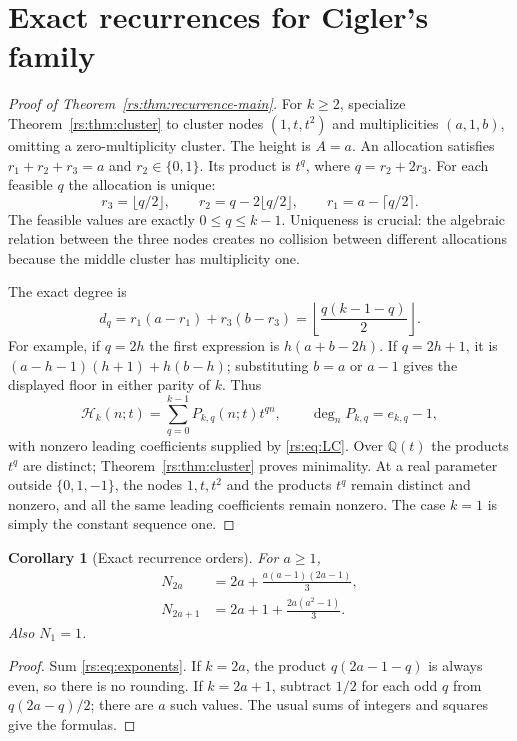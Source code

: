 \documentclass[11pt]{article}
\newtheorem{corollary}[theorem]{Corollary}
\theoremstyle{definition}
\theoremstyle{remark}
\newcommand{\Q}{\mathbb Q}
\newcommand{\Ht}{\mathcal H}
\theoremstyle{definition}
\theoremstyle{plain}
\numberwithin{equation}{section}
\begin{document}
\section{Exact recurrences for Cigler's family}
\label{rs:sec:recurrence}
\begin{proof}[Proof of Theorem~\ref{rs:thm:recurrence-main}]
For $k\ge2$, specialize Theorem~\ref{rs:thm:cluster} to cluster nodes
$(1,t,t^2)$ and multiplicities $(a,1,b)$, omitting a zero-multiplicity cluster.
The height is $A=a$. An allocation satisfies $r_1+r_2+r_3=a$ and
$r_2\in\{0,1\}$. Its product is $t^q$, where $q=r_2+2r_3$.
For each feasible $q$ the allocation is unique:
\begin{equation}
 r_3=\lfloor q/2\rfloor,\qquad r_2=q-2\lfloor q/2\rfloor,
 \qquad r_1=a-\lceil q/2\rceil.
 \label{rs:eq:qallocation}
\end{equation}
The feasible values are exactly $0\le q\le k-1$. Uniqueness is crucial:
the algebraic relation between the three nodes creates no collision between
different allocations because the middle cluster has multiplicity one.

The exact degree is
\begin{equation}
 d_q=r_1(a-r_1)+r_3(b-r_3)
     =\left\lfloor\frac{q(k-1-q)}2\right\rfloor.
 \label{rs:eq:dq}
\end{equation}
For example, if $q=2h$ the first expression is $h(a+b-2h)$.
If $q=2h+1$, it is $(a-h-1)(h+1)+h(b-h)$; substituting $b=a$ or $a-1$
gives the displayed floor in either parity of $k$.
Thus
\begin{equation}
 \Ht_k(n;t)=\sum_{q=0}^{k-1}P_{k,q}(n;t)t^{qn},\qquad
 \deg_n P_{k,q}=e_{k,q}-1,
 \label{rs:eq:spectralH}
\end{equation}
with nonzero leading coefficients supplied by \eqref{rs:eq:LC}.
Over $\Q(t)$ the products $t^q$ are distinct; Theorem~\ref{rs:thm:cluster}
proves minimality. At a real parameter outside $\{0,1,-1\}$, the nodes
$1,t,t^2$ and the products $t^q$ remain distinct and nonzero, and all the
same leading coefficients remain nonzero. The case $k=1$ is simply the
constant sequence one.
\end{proof}

\begin{corollary}[Exact recurrence orders]
\label{rs:cor:orders}
For $a\ge1$,
\begin{align}
 N_{2a}&=2a+\frac{a(a-1)(2a-1)}3,\label{rs:eq:N-even}\\
 N_{2a+1}&=2a+1+\frac{2a(a^2-1)}3.
 \label{rs:eq:N-odd}
\end{align}
Also $N_1=1$.
\end{corollary}
\begin{proof}
Sum \eqref{rs:eq:exponents}. If $k=2a$, the product $q(2a-1-q)$ is always
even, so there is no rounding. If $k=2a+1$, subtract $1/2$ for each odd
$q$ from $q(2a-q)/2$; there are $a$ such values. The usual sums of
integers and squares give the formulas.
\end{proof}
\end{document}
